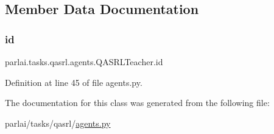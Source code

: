 \subsection{Member Data Documentation}
\mbox{\label{classparlai_1_1tasks_1_1qasrl_1_1agents_1_1QASRLTeacher_af5c5aa6c9bfe7adfebf9b58ca8ecec4c}} 
\subsubsection{\texorpdfstring{id}{id}}
{\footnotesize\ttfamily parlai.\+tasks.\+qasrl.\+agents.\+Q\+A\+S\+R\+L\+Teacher.\+id}



Definition at line 45 of file agents.\+py.



The documentation for this class was generated from the following file\+:\begin{DoxyCompactItemize}
\item 
parlai/tasks/qasrl/\hyperlink{parlai_2tasks_2qasrl_2agents_8py}{agents.\+py}\end{DoxyCompactItemize}
